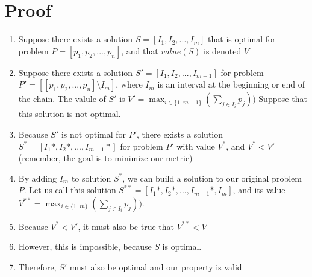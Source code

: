 \documentclass{article}
\begin{document}
\section{Proof}
\begin{enumerate}
	\item Suppose there exists a solution 
	$S = [I_1, I_2, ..., I_m]$ that is optimal for problem 
	$P = [p_1, p_2, ..., p_n]$, and that $value(S)$ is denoted $V$
	\item Suppose there exists a solution $S' = [I_1, I_2, ..., I_{m-1}]$ for
	problem $P'= [[p_1, p_2, ..., p_n] \setminus I_m]$, where $I_m$ is an
	interval at the beginning or end of the chain. The valule of $S'$ is
	$V' = \max_{i\in\{1..m-1\}}(\sum_{j \in{I_i}} p_j))$ 
	Suppose that this solution is not optimal.
	\item Because $S'$ is not optimal for $P'$, there exists a solution $S^* =
	[I_1*, I_2*, ..., I_{m-1}*]$ for problem $P'$ with value $V^*$, and $V^* <
	V'$ \\(remember, the goal is to minimize our metric) 

	\item By adding $I_m$ to solution $S^*$, we can build a solution to our
	original problem $P$. Let us call this solution $S^{**} = [I_1*, I_2*, ...,
	I_{m-1}*, I_m]$, and its value $V^{**} = \max_{i\in\{1..m\}}(\sum_{j
	\in{I_i}} p_j))$.

	\item Because $V^{*} < V'$, it must also be true that $V^{**} < V$

	\item However, this is impossible, because $S$ is optimal. 
	\item Therefore, $S'$ must also be optimal and our property is valid
\end{enumerate}
\end{document}
